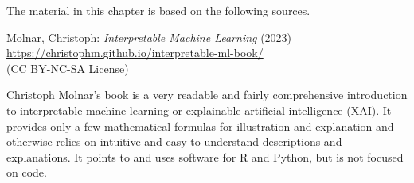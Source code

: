 The material in this chapter is based on the following sources.

\begin{resourcebox}
Molnar, Christoph: \emph{Interpretable Machine Learning} (2023) \\

\small\url{https://christophm.github.io/interpretable-ml-book/}\normalsize \\

(CC BY-NC-SA License)
\end{resourcebox}

Christoph Molnar's book is a very readable and fairly comprehensive introduction to interpretable machine learning or explainable artificial intelligence (XAI). It provides only a few mathematical formulas for illustration and explanation and otherwise relies on intuitive and easy-to-understand descriptions and explanations. It points to and uses software for R and Python, but is not focused on code.

